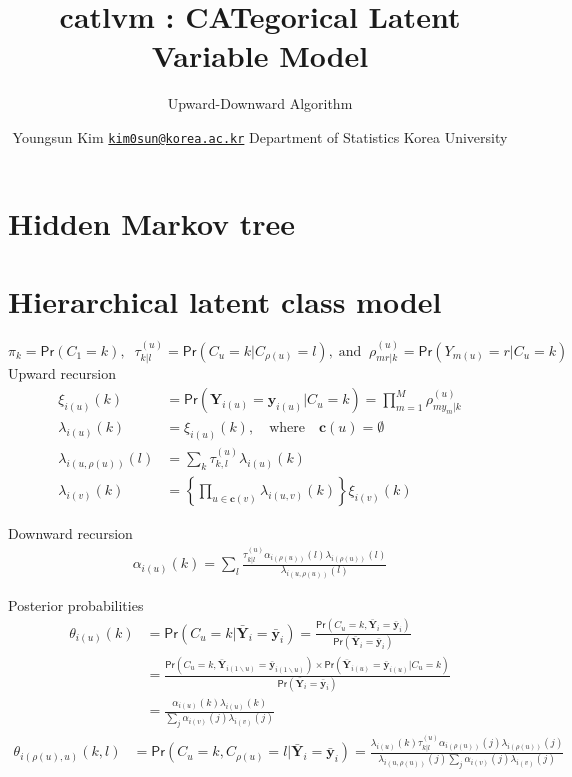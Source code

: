 \documentclass[
  11pt,
]{article}
\title{catlvm : CATegorical Latent Variable Model}
\subtitle{Upward-Downward Algorithm}
\author{
   \name Youngsun Kim
   \email \href{mailto:kim0sun@korea.ac.kr}{\nolinkurl{kim0sun@korea.ac.kr}}
   \addr Department of Statistics \newline Korea University 
}
\date{}
\begin{document}
\maketitle


\hypertarget{hmt}{%
\section{Hidden Markov tree}\label{hmt}}

\hypertarget{hlca}{%
\section{Hierarchical latent class model}\label{hlca}}

\[
\pi_k = \textsf{Pr}\left( C_1 = k \right),
\;\;
\tau_{k|l}^{(u)} = \textsf{Pr}\left( C_u = k|C_{\rho(u)} = l \right),
\; \text{and} \;\;
\rho_{mr|k}^{(u)} = \textsf{Pr}\left( Y_{m(u)} = r | C_{u} = k \right)
\]
Upward recursion
\[
\begin{aligned}
\xi_{i(u)}(k) &= \textsf{Pr}\left( \mathbf{Y}_{i(u)} = \mathbf{y}_{i(u)} | C_u = k \right) = 
\prod_{m = 1}^{M} \rho_{my_m|k}^{(u)}
\\
\lambda_{i(u)}(k) &= \xi_{i(u)}(k), \quad \text{where} \quad \mathbf{c}(u) = \emptyset
\\
\lambda_{i(u, \rho(u))}(l) &= \sum_k \tau_{k, l}^{(u)} \lambda_{i(u)}(k)
\\
\lambda_{i(v)}(k) &= \left\{ \prod_{u\in \mathbf{c}(v)} \lambda_{i(u, v)}(k) \right\} \xi_{i(v)}(k)
\end{aligned}
\]

Downward recursion
\[
\begin{aligned}
\alpha_{i(u)}(k) = \sum_{l}\frac{\tau_{k|l}^{(u)} \alpha_{i(\rho(u))}(l)  \lambda_{i(\rho(u))}(l)}{\lambda_{i(u, \rho(u))}(l)}
\end{aligned}
\]

Posterior probabilities
\[
\begin{aligned}
\theta_{i(u)}(k) &= \textsf{Pr}\left( C_u = k | \bar{\mathbf{Y}}_i = \bar{\mathbf{y}}_i \right) 
= \frac{ \textsf{Pr}\left( C_u = k, \bar{\mathbf{Y}}_i = \bar{\mathbf{y}}_i \right) }{ \textsf{Pr}\left( \bar{\mathbf{Y}}_i = \bar{\mathbf{y}}_i \right) }
\\
&=\frac{ \textsf{Pr}\left( C_u = k, \bar{\mathbf{Y}}_{i(1\backslash u)} = \bar{\mathbf{y}}_{i(1\backslash u)} \right) \times \textsf{Pr}\left( \bar{\mathbf{Y}}_{i(u)} = \bar{\mathbf{y}}_{i(u)} | C_u = k \right) }{ \textsf{Pr}\left( \bar{\mathbf{Y}}_i = \bar{\mathbf{y}}_i \right) }
\\
&= \frac{ \alpha_{i(u)}(k) \lambda_{i(u)}(k) }{ \sum_j \alpha_{i(v)}(j) \lambda_{i(v)}(j) }
\end{aligned}
\]
\[
\begin{aligned}
\theta_{i(\rho(u), u)}(k,l) &= \textsf{Pr}\left( C_u = k, C_{\rho(u)} = l | \bar{\mathbf{Y}}_i = \bar{\mathbf{y}}_i \right) 
= \frac{\lambda_{i(u)}(k) \tau_{k|l}^{(u)} \alpha_{i(\rho(u))}(j)  \lambda_{i(\rho(u))}(j)}{\lambda_{i(u, \rho(u))}(j) \sum_j \alpha_{i(v)}(j) \lambda_{i(v)}(j)}
\end{aligned}
\]
\end{document}
